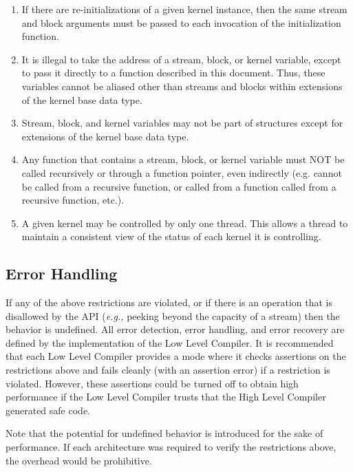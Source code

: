 \begin{enumerate}

\item If there are re-initializations of a given kernel instance, then
the same stream and block arguments must be passed to each invocation
of the initialization function.

\item It is illegal to take the address of a stream, block, or kernel
variable, except to pass it directly to a function described in this
document. Thus, these variables cannot be aliased other than streams
and blocks within extensions of the kernel base data type.

\item Stream, block, and kernel variables may not be part of
structures except for extensions of the kernel base data type.

\item Any function that contains a stream, block, or kernel variable
must NOT be called recursively or through a function pointer, even
indirectly (e.g. cannot be called from a recursive function, or called
from a function called from a recursive function, etc.).

\item A given kernel may be controlled by only one thread.  This
allows a thread to maintain a consistent view of the status of each
kernel it is controlling.

\end{enumerate}

\subsection{Error Handling}
\label{sec:errors}

If any of the above restrictions are violated, or if there is an
operation that is disallowed by the API ({\it e.g.,} peeking beyond
the capacity of a stream) then the behavior is undefined.  All error
detection, error handling, and error recovery are defined by the
implementation of the Low Level Compiler.  It is recommended that each
Low Level Compiler provides a mode where it checks assertions on the
restrictions above and fails cleanly (with an assertion error) if a
restriction is violated.  However, these assertions could be turned
off to obtain high performance if the Low Level Compiler trusts that
the High Level Compiler generated safe code.

Note that the potential for undefined behavior is introduced for the
sake of performance.  If each architecture was required to verify the
restrictions above, the overhead would be prohibitive.

